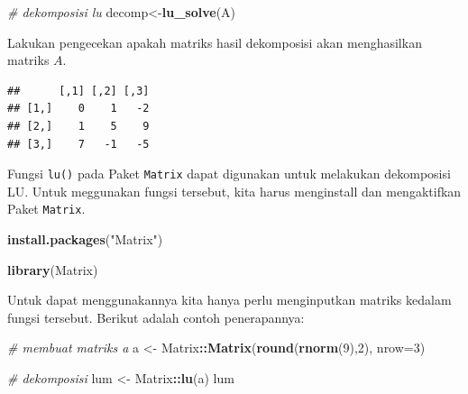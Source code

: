\documentclass[]{book}
\newenvironment{Shaded}{\begin{snugshade}}{\end{snugshade}}
\newcommand{\CommentTok}[1]{\textcolor[rgb]{0.56,0.35,0.01}{\textit{#1}}}
\newcommand{\DataTypeTok}[1]{\textcolor[rgb]{0.13,0.29,0.53}{#1}}
\newcommand{\DecValTok}[1]{\textcolor[rgb]{0.00,0.00,0.81}{#1}}
\newcommand{\KeywordTok}[1]{\textcolor[rgb]{0.13,0.29,0.53}{\textbf{#1}}}
\newcommand{\NormalTok}[1]{#1}
\newcommand{\OperatorTok}[1]{\textcolor[rgb]{0.81,0.36,0.00}{\textbf{#1}}}
\newcommand{\StringTok}[1]{\textcolor[rgb]{0.31,0.60,0.02}{#1}}
\theoremstyle{definition}
\theoremstyle{definition}
\theoremstyle{definition}
\theoremstyle{remark}
\begin{document}
\begin{Shaded}
\begin{Highlighting}[]
\CommentTok{# dekomposisi lu}
\NormalTok{decomp<-}\KeywordTok{lu_solve}\NormalTok{(A)}
\end{Highlighting}
\end{Shaded}

Lakukan pengecekan apakah matriks hasil dekomposisi akan menghasilkan matriks \(A\).

\begin{Shaded}
\end{Shaded}

\begin{verbatim}
##      [,1] [,2] [,3]
## [1,]    0    1   -2
## [2,]    1    5    9
## [3,]    7   -1   -5
\end{verbatim}

Fungsi \texttt{lu()} pada Paket \texttt{Matrix} dapat digunakan untuk melakukan dekomposisi LU. Untuk meggunakan fungsi tersebut, kita harus menginstall dan mengaktifkan Paket \texttt{Matrix}.

\begin{Shaded}
\begin{Highlighting}[]
\KeywordTok{install.packages}\NormalTok{(}\StringTok{"Matrix"}\NormalTok{)}
\end{Highlighting}
\end{Shaded}

\begin{Shaded}
\begin{Highlighting}[]
\KeywordTok{library}\NormalTok{(Matrix)}
\end{Highlighting}
\end{Shaded}

Untuk dapat menggunakannya kita hanya perlu menginputkan matriks kedalam fungsi tersebut. Berikut adalah contoh penerapannya:

\begin{Shaded}
\begin{Highlighting}[]
\CommentTok{# membuat matriks a }
\NormalTok{a <-}\StringTok{ }\NormalTok{Matrix}\OperatorTok{::}\KeywordTok{Matrix}\NormalTok{(}\KeywordTok{round}\NormalTok{(}\KeywordTok{rnorm}\NormalTok{(}\DecValTok{9}\NormalTok{),}\DecValTok{2}\NormalTok{), }\DataTypeTok{nrow=}\DecValTok{3}\NormalTok{)}

\CommentTok{# dekomposisi}
\NormalTok{lum <-}\StringTok{ }\NormalTok{Matrix}\OperatorTok{::}\KeywordTok{lu}\NormalTok{(a)}
\NormalTok{lum}
\end{Highlighting}
\end{Shaded}
\end{document}

